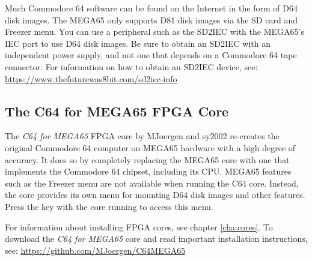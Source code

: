 Much Commodore 64 software can be found on the Internet in the form of D64 disk images. The MEGA65 only supports D81 disk images via the SD card and Freezer menu. You can use a peripheral such as the SD2IEC with the MEGA65's IEC port to use D64 disk images. Be sure to obtain an SD2IEC with an independent power supply, and not one that depends on a Commodore 64 tape connector. For information on how to obtain an SD2IEC device, see: \url{https://www.thefuturewas8bit.com/sd2iec-info}

\subsection{The C64 for MEGA65 FPGA Core}

The {\it C64 for MEGA65} FPGA core by MJoergen and sy2002 re-creates the original Commodore 64 computer on MEGA65 hardware with a high degree of accuracy. It does so by completely replacing the MEGA65 core with one that implements the Commodore 64 chipset, including its CPU. MEGA65 features such as the Freezer menu are not available when running the C64 core. Instead, the core provides its own menu for mounting D64 disk images and other features. Press the  key with the core running to access this menu.


For information about installing FPGA cores, see chapter \vref{cha:cores}. To download the {\it C64 for MEGA65} core and read important installation instructions, see: \url{https://github.com/MJoergen/C64MEGA65}
